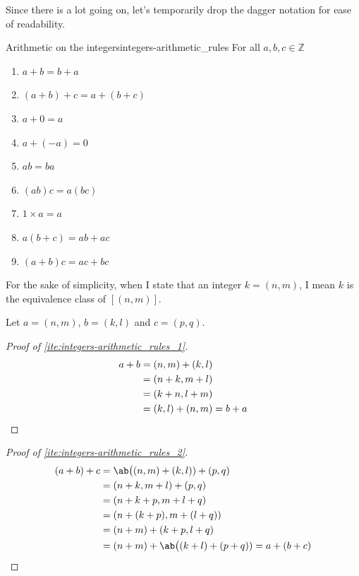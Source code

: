 Since there is a lot going on, let's temporarily drop the dagger notation for ease of readability.

\begin{prop}{Arithmetic on the integers}{integers-arithmetic_rules}
  For all \(a, b, c \in \mathbb{Z}\)
  \begin{enumerate}[noitemsep]
    \item \(a + b = b + a\) \label{ite:integers-arithmetic_rules_1}
    \item \((a + b) + c = a + (b + c)\) \label{ite:integers-arithmetic_rules_2}
    \item \(a + 0 = a\) \label{ite:integers-arithmetic_rules_3}
    \item \(a + (-a) = 0\) \label{ite:integers-arithmetic_rules_4}
    \item \(ab = ba\) \label{ite:integers-arithmetic_rules_5}
    \item \((ab)c = a(bc)\) \label{ite:integers-arithmetic_rules_6}
    \item \(1 \times a = a\) \label{ite:integers-arithmetic_rules_7}
    \item \(a(b + c) = ab + ac\) \label{ite:integers-arithmetic_rules_8}
    \item \((a + b)c = ac + bc\) \label{ite:integers-arithmetic_rules_9}
  \end{enumerate}
\end{prop}

For the sake of simplicity, when I state that an integer \(k = (n, m)\), I mean \(k\) is the
equivalence class of \([(n, m)]\).

Let \(a = (n, m)\), \(b = (k, l)\) and \(c = (p, q)\).

\begin{proof}[Proof of \cref{ite:integers-arithmetic_rules_1}]
  \begin{align}
    a + b & = (n, m) + (k, l)                  \\
          & = (n + k, m + l)                   \\
          & = (k + n, l + m)                   \\
          & = (k, l) + (n, m) = b + a \qedhere
  \end{align}
\end{proof}

\begin{proof}[Proof of \cref{ite:integers-arithmetic_rules_2}]
  \begin{align}
    (a + b) + c & = \ab\big((n, m) + (k, l)) + (p, q)                           \\
                & = (n + k, m + l) + (p, q)                                     \\
                & = (n + k + p, m + l + q)                                      \\
                & = (n + (k + p), m + (l + q))                                  \\
                & = (n + m) + (k + p, l + q)                                    \\
                & = (n + m) + \ab\big((k + l) + (p + q)) = a + (b + c) \qedhere
  \end{align}
\end{proof}

